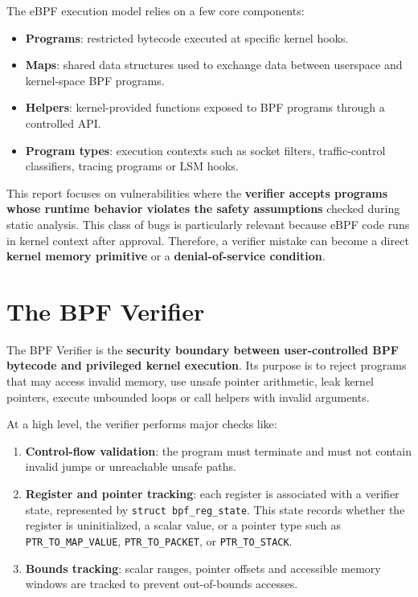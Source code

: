 \documentclass{report}
\begin{document}
    The eBPF execution model relies on a few core components:

    \begin{itemize}
        \item \textbf{Programs}: restricted bytecode executed at specific kernel hooks.
        \item \textbf{Maps}: shared data structures used to exchange data between userspace and kernel-space BPF programs.
        \item \textbf{Helpers}: kernel-provided functions exposed to BPF programs through a controlled API.
        \item \textbf{Program types}: execution contexts such as socket filters, traffic-control classifiers, tracing programs or LSM hooks.
    \end{itemize}

    This report focuses on vulnerabilities where the \textbf{verifier accepts programs whose runtime behavior violates the safety assumptions} checked during static analysis. This class of bugs is particularly relevant because eBPF code runs in kernel context after approval. Therefore, a verifier mistake can become a direct \textbf{kernel memory primitive} or a \textbf{denial-of-service condition}.

    \section{The BPF Verifier}

    The BPF Verifier is the \textbf{security boundary between user-controlled BPF bytecode and privileged kernel execution}. Its purpose is to reject programs that may access invalid memory, use unsafe pointer arithmetic, leak kernel pointers, execute unbounded loops or call helpers with invalid arguments.

    At a high level, the verifier performs major checks like:

    \begin{enumerate}
        \item \textbf{Control-flow validation}: the program must terminate and must not contain invalid jumps or unreachable unsafe paths.
        \item \textbf{Register and pointer tracking}: each register is associated with a verifier state, represented by \texttt{struct bpf\_reg\_state}. This state records whether the register is uninitialized, a scalar value, or a pointer type such as \texttt{PTR\_TO\_MAP\_VALUE}, \texttt{PTR\_TO\_PACKET}, or \texttt{PTR\_TO\_STACK}.
        \item \textbf{Bounds tracking}: scalar ranges, pointer offsets and accessible memory windows are tracked to prevent out-of-bounds accesses.
    \end{enumerate}
\end{document}
